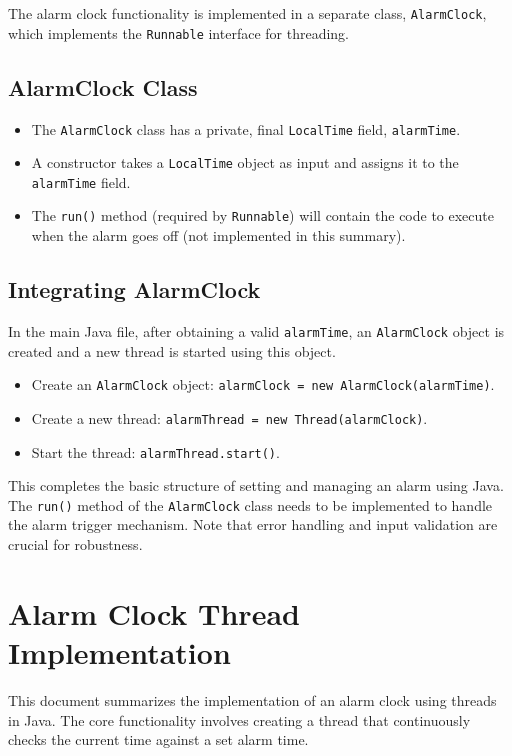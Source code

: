 \documentclass{article}
\begin{document}
\begin{itemize}
The alarm clock functionality is implemented in a separate class, \texttt{AlarmClock}, which implements the \texttt{Runnable} interface for threading.

\subsection{AlarmClock Class}

\begin{itemize}
    \item The \texttt{AlarmClock} class has a private, final \texttt{LocalTime} field, \texttt{alarmTime}.
    \item A constructor takes a \texttt{LocalTime} object as input and assigns it to the \texttt{alarmTime} field.
    \item The \texttt{run()} method (required by \texttt{Runnable}) will contain the code to execute when the alarm goes off (not implemented in this summary).
\end{itemize}

\subsection{Integrating AlarmClock}

In the main Java file, after obtaining a valid \texttt{alarmTime}, an \texttt{AlarmClock} object is created and a new thread is started using this object.

\begin{itemize}
    \item Create an \texttt{AlarmClock} object: \texttt{alarmClock = new AlarmClock(alarmTime)}.
    \item Create a new thread: \texttt{alarmThread = new Thread(alarmClock)}.
    \item Start the thread: \texttt{alarmThread.start()}.
\end{itemize}

This completes the basic structure of setting and managing an alarm using Java.  The \texttt{run()} method of the \texttt{AlarmClock} class needs to be implemented to handle the alarm trigger mechanism.  Note that error handling and input validation are crucial for robustness.


\section{Alarm Clock Thread Implementation}

This document summarizes the implementation of an alarm clock using threads in Java. The core functionality involves creating a thread that continuously checks the current time against a set alarm time.


\end{itemize}
\end{document}
